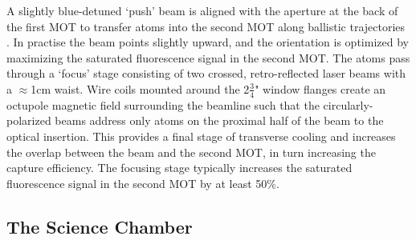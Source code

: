 	A slightly blue-detuned `push' beam is aligned with the aperture at the back of the first MOT to transfer atoms into the second MOT along ballistic trajectories \cite{swansson04}. In practise the beam points slightly upward, and the orientation is optimized by maximizing the saturated fluorescence signal in the second MOT. The atoms pass through a `focus' stage consisting of two crossed, retro-reflected laser beams with a $\approx$1cm waist. Wire coils mounted around the 2$\frac{3}{4}$" window flanges create an octupole  magnetic field surrounding the beamline such that the circularly-polarized beams address only atoms on the proximal half of the beam to the optical insertion. This provides a final stage of transverse cooling and increases the overlap between the beam and the second MOT, in turn increasing the capture efficiency. The focusing stage typically increases the saturated fluorescence signal in the second MOT by at least 50\%. 

\subsection*{The Science Chamber}

